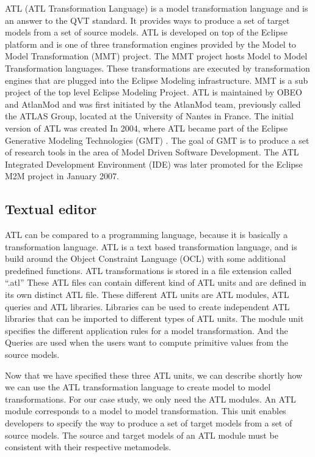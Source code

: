 ATL\cite{ATL} (ATL Transformation Language) is a model transformation
language and is an answer to the QVT\cite{QVT} standard. It
provides ways to produce a set of target models from a set of source models.
ATL is developed on top of the Eclipse platform and is one of three
transformation engines provided by the Model to Model Transformation (MMT)
project\cite{MMT}. The MMT project hosts Model to Model Transformation
languages. These transformations are executed by transformation engines that are
plugged into the Eclipse Modeling infrastructure. MMT is a sub project of the
top level Eclipse Modeling Project\cite{EMP}. ATL is maintained by
OBEO\cite{OBEO} and AtlanMod\cite{ATLANMod} and was first initiated by the
AtlanMod team, previously called the ATLAS Group, located at the University of
Nantes in France. The initial version of ATL was created In 2004, where ATL
became part of the Eclipse Generative Modeling Technologies (GMT) \cite{GMT}.
The goal of GMT is to produce a set of research tools in the area of Model
Driven Software Development. The ATL Integrated Development Environment (IDE)
was later promoted for the Eclipse M2M project in January 2007.

\subsection{Textual editor}

ATL can be compared to a programming language, because it is
basically a transformation language. ATL is a text based transformation
language, and is build around the Object Constraint Language (OCL) \cite{OCL}
with some additional predefined functions. ATL transformations is stored in a
file extension called ``.atl'' These ATL files can contain different kind of
ATL units and are defined in its own distinct ATL file. These different ATL
units are ATL modules, ATL queries and ATL libraries. Libraries can be used to
create independent ATL libraries that can be imported to different types of ATL
units. The module unit specifies the different application rules for a  model
transformation. And the Queries are used when the users want to compute
primitive values from the source models.

Now that we have specified these three ATL units, we can describe shortly how
we can use the ATL transformation language to create model to model
transformations. For our case study, we only need the ATL modules. An ATL module
corresponds to a model to model transformation. This unit enables developers to
specify the way to produce a set of target models from a set of source models.
The source and target models of an ATL module must be consistent with their
respective metamodels. 


